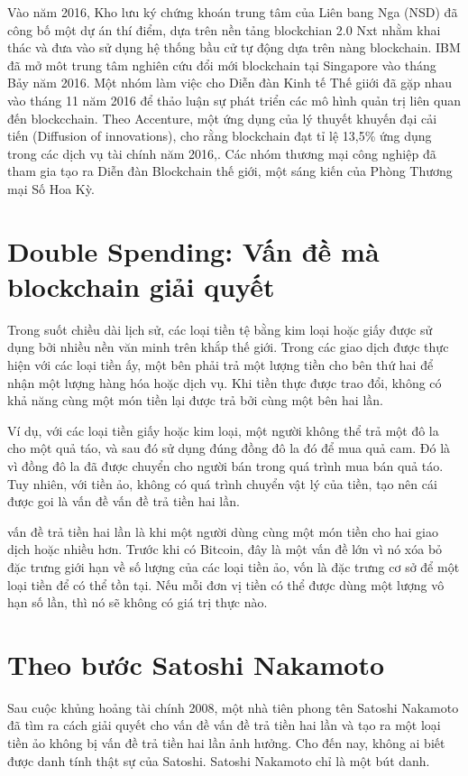 Vào năm 2016, Kho lưu ký chứng khoán trung tâm của Liên bang Nga (NSD) đã công bố một dự án thí điểm, dựa trên nền tảng blockchian 2.0 Nxt nhằm khai thác và đưa vào sử dụng hệ thống bầu cử tự động dựa trên nàng blockchain. IBM đã mở môt trung tâm nghiên cứu đổi mới blockchain tại Singapore vào tháng Bảy năm 2016. Một nhóm làm việc cho Diễn đàn Kinh tế Thế giiới đã gặp nhau vào tháng 11 năm 2016 để thảo luận sự phát triển các mô hình quản trị liên quan đến blockcchain. Theo Accenture, một ứng dụng của lý thuyết khuyến đại cải tiến (Diffusion of innovations), cho rằng blockchain đạt tỉ lệ 13,5\% ứng dụng trong các dịch vụ tài chính năm 2016,. Các nhóm thương mại công nghiệp đã tham gia tạo ra Diễn đàn Blockchain thế giới, một sáng kiến của Phòng Thương mại Số Hoa Kỳ. 

\section{Double Spending: Vấn đề mà blockchain giải quyết}
Trong suốt chiều dài lịch sử, các loại tiền tệ bằng kim loại hoặc giấy được sử dụng bởi nhiều nền văn minh trên khắp thế giới. Trong các giao dịch được thực hiện với các loại tiền ấy, một bên phải trả một lượng tiền cho bên thứ hai để nhận một lượng hàng hóa hoặc dịch vụ. Khi tiền thực được trao đổi, không có khả năng cùng một món tiền lại được trả bởi cùng một bên hai lần.

Ví dụ, với các loại tiền giấy hoặc kim loại, một người không thể trả một đô la cho một quả táo, và sau đó sử dụng  đúng đồng đô la đó để mua quả cam. Đó là vì  đồng đô la đã được chuyển cho người bán trong quá trình mua bán quả táo. Tuy nhiên, với tiền ảo, không có quá trình chuyển vật lý của tiền, tạo nên cái được goi là vấn đề vấn đề trả tiền hai lần.

vấn đề trả tiền hai lần là khi một người dùng cùng một món tiền cho hai giao dịch hoặc nhiều hơn. Trước khi có Bitcoin, đây là một vấn đề lớn vì nó xóa bỏ đặc trưng giới hạn về số lượng của các loại tiền ảo, vốn là đặc trưng cơ sở để một loại tiền để có thể tồn tại. Nếu mỗi đơn vị tiền có thể được dùng một lượng vô hạn số lần, thì nó sẽ không có giá trị thực nào.

\section{Theo bước Satoshi Nakamoto}

Sau cuộc khủng hoảng tài chính 2008, một nhà tiên phong tên Satoshi Nakamoto đã tìm ra cách giải quyết cho  vấn đề vấn đề trả tiền hai lần và tạo ra một loại tiền ảo không bị vấn đề trả tiền hai lần ảnh hưởng. Cho đến nay, không ai biết được danh tính thật sự của Satoshi. Satoshi Nakamoto chỉ là một bút danh.


